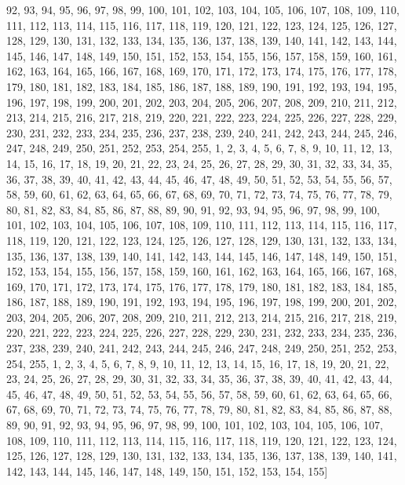 92, 93, 94, 95, 96, 97, 98, 99, 100, 101, 102, 103, 104, 105, 106, 107, 108, 109, 110, 111, 112, 113, 114, 115, 116, 117, 118, 119, 120, 121, 122, 123, 124, 125, 126, 127, 128, 129, 130, 131, 132, 133, 134, 135, 136, 137, 138, 139, 140, 141, 142, 143, 144, 145, 146, 147, 148, 149, 150, 151, 152, 153, 154, 155, 156, 157, 158, 159, 160, 161, 162, 163, 164, 165, 166, 167, 168, 169, 170, 171, 172, 173, 174, 175, 176, 177, 178, 179, 180, 181, 182, 183, 184, 185, 186, 187, 188, 189, 190, 191, 192, 193, 194, 195, 196, 197, 198, 199, 200, 201, 202, 203, 204, 205, 206, 207, 208, 209, 210, 211, 212, 213, 214, 215, 216, 217, 218, 219, 220, 221, 222, 223, 224, 225, 226, 227, 228, 229, 230, 231, 232, 233, 234, 235, 236, 237, 238, 239, 240, 241, 242, 243, 244, 245, 246, 247, 248, 249, 250, 251, 252, 253, 254, 255, 1, 2, 3, 4, 5, 6, 7, 8, 9, 10, 11, 12, 13, 14, 15, 16, 17, 18, 19, 20, 21, 22, 23, 24, 25, 26, 27, 28, 29, 30, 31, 32, 33, 34, 35, 36, 37, 38, 39, 40, 41, 42, 43, 44, 45, 46, 47, 48, 49, 50, 51, 52, 53, 54, 55, 56, 57, 58, 59, 60, 61, 62, 63, 64, 65, 66, 67, 68, 69, 70, 71, 72, 73, 74, 75, 76, 77, 78, 79, 80, 81, 82, 83, 84, 85, 86, 87, 88, 89, 90, 91, 92, 93, 94, 95, 96, 97, 98, 99, 100, 101, 102, 103, 104, 105, 106, 107, 108, 109, 110, 111, 112, 113, 114, 115, 116, 117, 118, 119, 120, 121, 122, 123, 124, 125, 126, 127, 128, 129, 130, 131, 132, 133, 134, 135, 136, 137, 138, 139, 140, 141, 142, 143, 144, 145, 146, 147, 148, 149, 150, 151, 152, 153, 154, 155, 156, 157, 158, 159, 160, 161, 162, 163, 164, 165, 166, 167, 168, 169, 170, 171, 172, 173, 174, 175, 176, 177, 178, 179, 180, 181, 182, 183, 184, 185, 186, 187, 188, 189, 190, 191, 192, 193, 194, 195, 196, 197, 198, 199, 200, 201, 202, 203, 204, 205, 206, 207, 208, 209, 210, 211, 212, 213, 214, 215, 216, 217, 218, 219, 220, 221, 222, 223, 224, 225, 226, 227, 228, 229, 230, 231, 232, 233, 234, 235, 236, 237, 238, 239, 240, 241, 242, 243, 244, 245, 246, 247, 248, 249, 250, 251, 252, 253, 254, 255, 1, 2, 3, 4, 5, 6, 7, 8, 9, 10, 11, 12, 13, 14, 15, 16, 17, 18, 19, 20, 21, 22, 23, 24, 25, 26, 27, 28, 29, 30, 31, 32, 33, 34, 35, 36, 37, 38, 39, 40, 41, 42, 43, 44, 45, 46, 47, 48, 49, 50, 51, 52, 53, 54, 55, 56, 57, 58, 59, 60, 61, 62, 63, 64, 65, 66, 67, 68, 69, 70, 71, 72, 73, 74, 75, 76, 77, 78, 79, 80, 81, 82, 83, 84, 85, 86, 87, 88, 89, 90, 91, 92, 93, 94, 95, 96, 97, 98, 99, 100, 101, 102, 103, 104, 105, 106, 107, 108, 109, 110, 111, 112, 113, 114, 115, 116, 117, 118, 119, 120, 121, 122, 123, 124, 125, 126, 127, 128, 129, 130, 131, 132, 133, 134, 135, 136, 137, 138, 139, 140, 141, 142, 143, 144, 145, 146, 147, 148, 149, 150, 151, 152, 153, 154, 155]

